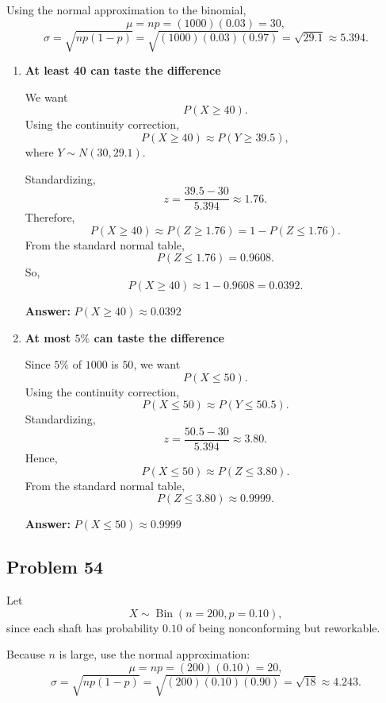 Using the normal approximation to the binomial,
\[
\mu=np=(1000)(0.03)=30,
\]
\[
\sigma=\sqrt{np(1-p)}=\sqrt{(1000)(0.03)(0.97)}=\sqrt{29.1}\approx 5.394.
\]

\begin{enumerate}
    \item[(a)] \textbf{At least 40 can taste the difference}

    We want
    \[
    P(X\ge 40).
    \]
    Using the continuity correction,
    \[
    P(X\ge 40)\approx P\left(Y\ge 39.5\right),
    \]
    where $Y\sim N(30,29.1)$.

    Standardizing,
    \[
    z=\frac{39.5-30}{5.394}\approx 1.76.
    \]
    Therefore,
    \[
    P(X\ge 40)\approx P(Z\ge 1.76)=1-P(Z\le 1.76).
    \]
    From the standard normal table,
    \[
    P(Z\le 1.76)=0.9608.
    \]
    So,
    \[
    P(X\ge 40)\approx 1-0.9608=0.0392.
    \]

    \textbf{Answer:} $P(X\ge 40)\approx 0.0392$

    \item[(b)] \textbf{At most $5\%$ can taste the difference}

    Since $5\%$ of $1000$ is $50$, we want
    \[
    P(X\le 50).
    \]
    Using the continuity correction,
    \[
    P(X\le 50)\approx P(Y\le 50.5).
    \]
    Standardizing,
    \[
    z=\frac{50.5-30}{5.394}\approx 3.80.
    \]
    Hence,
    \[
    P(X\le 50)\approx P(Z\le 3.80).
    \]
    From the standard normal table,
    \[
    P(Z\le 3.80)\approx 0.9999.
    \]

    \textbf{Answer:} $P(X\le 50)\approx 0.9999$
\end{enumerate}

\subsection*{Problem 54}

Let
\[
X\sim \operatorname{Bin}(n=200,p=0.10),
\]
since each shaft has probability $0.10$ of being nonconforming but reworkable.

Because $n$ is large, use the normal approximation:
\[
\mu=np=(200)(0.10)=20,
\]
\[
\sigma=\sqrt{np(1-p)}=\sqrt{(200)(0.10)(0.90)}=\sqrt{18}\approx 4.243.
\]

